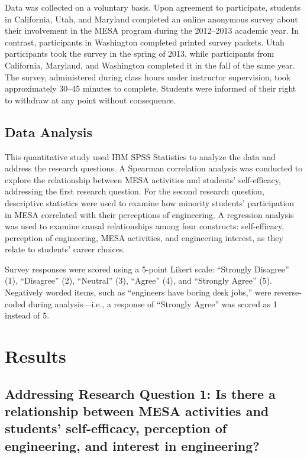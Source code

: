 \documentclass[11pt]{article}
\begin{document}
Data was collected on a voluntary basis. Upon agreement to participate, students in California, Utah, and Maryland completed an online anonymous survey about their involvement in the MESA program during the 2012--2013 academic year. In contrast, participants in Washington completed printed survey packets. Utah participants took the survey in the spring of 2013, while participants from California, Maryland, and Washington completed it in the fall of the same year. The survey, administered during class hours under instructor supervision, took approximately 30--45 minutes to complete. Students were informed of their right to withdraw at any point without consequence.

\subsection{Data Analysis}

This quantitative study used IBM SPSS Statistics to analyze the data and address the research questions. A Spearman correlation analysis was conducted to explore the relationship between MESA activities and students’ self-efficacy, addressing the first research question. For the second research question, descriptive statistics were used to examine how minority students' participation in MESA correlated with their perceptions of engineering. A regression analysis was used to examine causal relationships among four constructs: self-efficacy, perception of engineering, MESA activities, and engineering interest, as they relate to students’ career choices.

Survey responses were scored using a 5-point Likert scale: “Strongly Disagree” (1), “Disagree” (2), “Neutral” (3), “Agree” (4), and “Strongly Agree” (5). Negatively worded items, such as “engineers have boring desk jobs,” were reverse-coded during analysis—i.e., a response of “Strongly Agree” was scored as 1 instead of 5.

\section{Results}

\subsection{Addressing Research Question 1: Is there a relationship between MESA activities and students’ self-efficacy, perception of engineering, and interest in engineering?}
\end{document}
